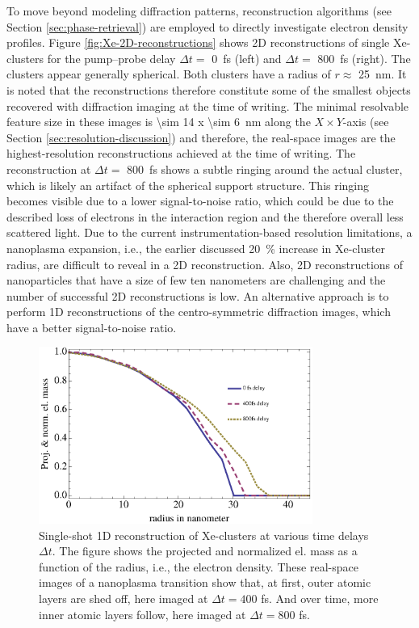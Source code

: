To move beyond modeling diffraction patterns, reconstruction algorithms (see Section \ref{sec:phase-retrieval}) are employed to directly investigate electron density profiles. Figure \ref{fig:Xe-2D-reconstructions} shows 2D reconstructions of single Xe-clusters for the pump--probe delay $\Delta t =$ \SI{0}{\femto\second} (left) and $\Delta t=$ \SI{800}{\femto\second} (right). The clusters appear generally spherical. Both clusters have a radius of $r\approx$ \SI{25}{\nano\meter}. It is noted that the reconstructions therefore constitute some of the smallest objects recovered with diffraction imaging at the time of writing. The minimal resolvable feature size in these images is \SI{\sim 14 x \sim 6}{\nano\meter} along the $X \times Y$-axis (see Section \ref{sec:resolution-discussion}) and therefore, the real-space images are the highest-resolution reconstructions achieved at the time of writing. The reconstruction at $\Delta t=$ \SI{800}{\femto\second} shows a subtle ringing around the actual cluster, which is likely an artifact of the spherical support structure. This ringing becomes visible due to a lower signal-to-noise ratio, which could be due to the described loss of electrons in the interaction region and the therefore overall less scattered light. Due to the current instrumentation-based resolution limitations, a nanoplasma expansion, i.e., the earlier discussed \SI{20}{\percent} increase in Xe-cluster radius, are difficult to reveal in a 2D reconstruction. Also, 2D reconstructions of nanoparticles that have a size of few ten nanometers are challenging and the number of successful 2D reconstructions is low. An alternative approach is to perform 1D reconstructions of the centro-symmetric diffraction images, which have a better signal-to-noise ratio.\\[1\baselineskip]
\begin{figure}
	\centering
		\includegraphics[width=0.80\textwidth]{images/results/Xe-reconstructions.eps}
	\caption[Single-shot 1D reconstruction of \SI{\sim 30}{\nano\meter} radius Xe-cluster]{Single-shot 1D reconstruction of Xe-clusters at various time delays $\Delta t$. The figure shows the projected and normalized el. mass as a function of the radius, i.e., the electron density. These real-space images of a nanoplasma transition show that, at first, outer atomic layers are shed off, here imaged at $\Delta t=400$ fs. And over time, more inner atomic layers follow, here imaged at $\Delta t= 800$ fs.}
	\label{fig:Xe-reconstructions}
\end{figure}
